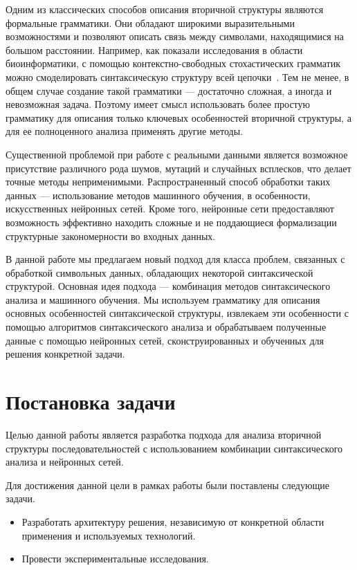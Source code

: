 Одним из классических способов описания вторичной структуры являются формальные грамматики. Они обладают широкими выразительными возможностями и позволяют описать связь между символами, находящимися на большом расстоянии. Например, как показали исследования в области биоинформатики, с помощью контекстно-свободных стохастических грамматик можно смоделировать синтаксическую структуру всей цепочки~\cite{dowell2004rna,PCFG}. Тем не менее, в общем случае создание такой грамматики --- достаточно сложная, а иногда и невозможная задача. Поэтому имеет смысл использовать более простую грамматику для описания только ключевых особенностей вторичной структуры, а для ее полноценного анализа применять другие методы.

Существенной проблемой при работе с реальными данными является возможное присутствие различного рода шумов, мутаций и случайных всплесков, что делает точные методы неприменимыми. Распространенный способ обработки таких данных --- использование методов машинного обучения, в особенности, искусственных нейронных сетей. Кроме того, нейронные сети предоставляют возможность эффективно находить сложные и не поддающиеся формализации структурные закономерности во входных данных.

В данной работе мы предлагаем новый подход для класса проблем, связанных с обработкой символьных данных, обладающих некоторой синтаксической структурой. Основная идея подхода --- комбинация методов синтаксического анализа и машинного обучения. Мы используем грамматику для описания основных особенностей синтаксической структуры, извлекаем эти особенности с помощью алгоритмов синтаксического анализа и обрабатываем полученные данные с помощью нейронных сетей, сконструированных и обученных для решения конкретной задачи.

\section{Постановка задачи}
Целью данной работы является разработка подхода для анализа вторичной структуры последовательностей с использованием комбинации синтаксического анализа и нейронных сетей.

Для достижения данной цели в рамках работы были поставлены следующие задачи.
\begin{itemize}
    \item Разработать архитектуру решения, независимую от конкретной области применения и используемых технологий.
    \item Провести экспериментальные исследования.
\end{itemize}

